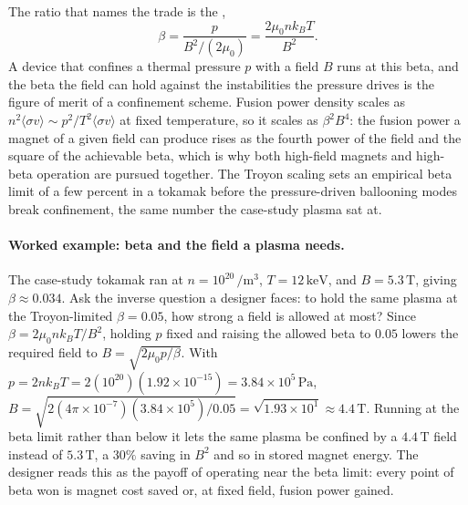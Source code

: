 

The ratio that names the trade is the ,
\[
\beta = \frac{p}{B^{2}/(2\mu_{0})} = \frac{2\mu_{0}nk_{B}T}{B^{2}}.
\]
A device that confines a thermal pressure $p$ with a field $B$ runs at this
beta, and the beta the field can hold against the instabilities the pressure
drives is the figure of merit of a confinement scheme. Fusion power density
scales as $n^{2}\langle\sigma v\rangle \sim p^{2}/T^{2}\langle\sigma v
\rangle$ at fixed temperature, so it scales as $\beta^{2}B^{4}$: the fusion
power a magnet of a given field can produce rises as the fourth power of the
field and the square of the achievable beta, which is why both high-field
magnets and high-beta operation are pursued together. The Troyon scaling
sets an empirical beta limit of a few percent in a tokamak before the
pressure-driven ballooning modes break confinement, the same number the
case-study plasma sat at.

\paragraph{Worked example: beta and the field a plasma needs.}
The case-study tokamak ran at $n = 10^{20}\,\si{\per\meter\cubed}$,
$T = 12\,\si{\kilo\electronvolt}$, and $B = 5.3\,\si{\tesla}$, giving
$\beta \approx 0.034$. Ask the inverse question a designer faces: to hold
the same plasma at the Troyon-limited $\beta = 0.05$, how strong a field is
allowed at most? Since $\beta = 2\mu_{0}nk_{B}T/B^{2}$, holding $p$ fixed and
raising the allowed beta to $0.05$ lowers the required field to $B =
\sqrt{2\mu_{0}p/\beta}$. With $p = 2nk_{B}T = 2(10^{20})(1.92\times
10^{-15}) = 3.84\times 10^{5}\,\si{\pascal}$, $B = \sqrt{2(4\pi\times
10^{-7})(3.84\times 10^{5})/0.05} = \sqrt{1.93\times 10^{1}} \approx
4.4\,\si{\tesla}$. Running at the beta limit rather than below it lets the
same plasma be confined by a $4.4\,\si{\tesla}$ field instead of
$5.3\,\si{\tesla}$, a $30\%$ saving in $B^{2}$ and so in stored magnet
energy. The designer reads this as the payoff of operating near the beta
limit: every point of beta won is magnet cost saved or, at fixed field,
fusion power gained.

